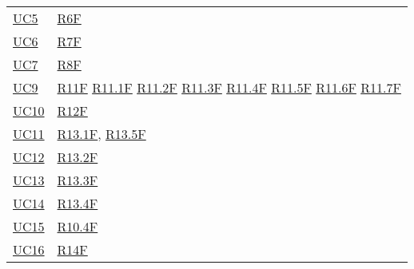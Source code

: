 \begin{center}
\begin{longtable}[!h]{m{50px} m{50px}}
        \hyperref[sec:UC5]{UC5}           & \hyperref[tab:RequisitiFunzionali]{R6F}     \\

        \hyperref[sec:UC6]{UC6}           & \hyperref[tab:RequisitiFunzionali]{R7F}     \\

        \hyperref[sec:UC7]{UC7}           & \hyperref[tab:RequisitiFunzionali]{R8F}     \\

        \hyperref[sec:UC9]{UC9}           & \hyperref[tab:RequisitiFunzionali]{R11F}
        \newline \hyperref[tab:RequisitiFunzionali]{R11.1F}
        \newline \hyperref[tab:RequisitiFunzionali]{R11.2F}
        \newline \hyperref[tab:RequisitiFunzionali]{R11.3F}
        \newline \hyperref[tab:RequisitiFunzionali]{R11.4F}
        \newline \hyperref[tab:RequisitiFunzionali]{R11.5F}
        \newline \hyperref[tab:RequisitiFunzionali]{R11.6F}                            
        \newline \hyperref[tab:RequisitiFunzionali]{R11.7F}\\

        \hyperref[sec:UC10]{UC10}         & \hyperref[tab:RequisitiFunzionali]{R12F}    \\

        \hyperref[sec:UC11]{UC11}         & \hyperref[tab:RequisitiFunzionali]{R13.1F},
        \newline \hyperref[tab:RequisitiFunzionali]{R13.5F}                             \\

        \hyperref[sec:UC12]{UC12}         & \hyperref[tab:RequisitiFunzionali]{R13.2F}  \\

        \hyperref[sec:UC13]{UC13}         & \hyperref[tab:RequisitiFunzionali]{R13.3F}  \\

        \hyperref[sec:UC14]{UC14}         & \hyperref[tab:RequisitiFunzionali]{R13.4F}  \\

        \hyperref[sec:UC15]{UC15}         & \hyperref[tab:RequisitiFunzionali]{R10.4F}  \\

        \hyperref[sec:UC16]{UC16}         & \hyperref[tab:RequisitiFunzionali]{R14F}    \\


\end{longtable}
\end{center}
